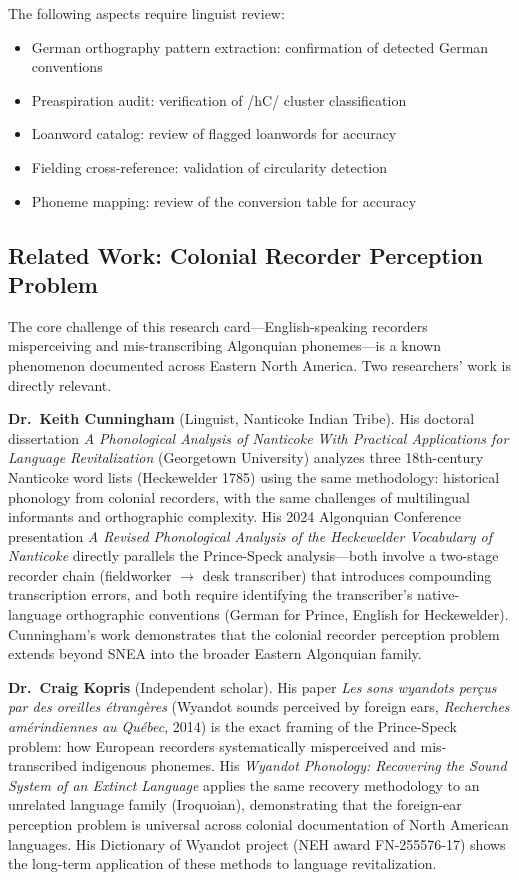 The following aspects require linguist review:

\begin{itemize}
  \item German orthography pattern extraction: confirmation of detected
    German conventions
  \item Preaspiration audit: verification of /hC/ cluster classification
  \item Loanword catalog: review of flagged loanwords for accuracy
  \item Fielding cross-reference: validation of circularity detection
  \item Phoneme mapping: review of the conversion table for accuracy
\end{itemize}

\subsection{Related Work: Colonial Recorder Perception Problem}

The core challenge of this research card---English-speaking recorders
misperceiving and mis-transcribing Algonquian phonemes---is a known
phenomenon documented across Eastern North America. Two researchers' work
is directly relevant.

\textbf{Dr.\ Keith Cunningham} (Linguist, Nanticoke Indian Tribe). His
doctoral dissertation \emph{A Phonological Analysis of Nanticoke With
Practical Applications for Language Revitalization} (Georgetown University)
analyzes three 18th-century Nanticoke word lists (Heckewelder 1785) using
the same methodology: historical phonology from colonial recorders, with the
same challenges of multilingual informants and orthographic complexity. His
2024 Algonquian Conference presentation \emph{A Revised Phonological Analysis
of the Heckewelder Vocabulary of Nanticoke} directly parallels the
Prince-Speck analysis---both involve a two-stage recorder chain (fieldworker
$\rightarrow$ desk transcriber) that introduces compounding transcription
errors, and both require identifying the transcriber's native-language
orthographic conventions (German for Prince, English for Heckewelder).
Cunningham's work demonstrates that the colonial recorder perception problem
extends beyond SNEA into the broader Eastern Algonquian family.

\textbf{Dr.\ Craig Kopris} (Independent scholar). His paper \emph{Les sons
wyandots perçus par des oreilles étrangères} (Wyandot sounds perceived by
foreign ears, \emph{Recherches amérindiennes au Québec}, 2014) is the exact
framing of the Prince-Speck problem: how European recorders systematically
misperceived and mis-transcribed indigenous phonemes. His \emph{Wyandot
Phonology: Recovering the Sound System of an Extinct Language} applies the
same recovery methodology to an unrelated language family (Iroquoian),
demonstrating that the foreign-ear perception problem is universal across
colonial documentation of North American languages. His Dictionary of
Wyandot project (NEH award FN-255576-17) shows the long-term application of
these methods to language revitalization.

